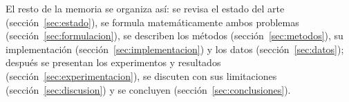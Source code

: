 El resto de la memoria se organiza así: se revisa el estado del arte (sección~\ref{sec:estado}), se formula matemáticamente ambos problemas (sección~\ref{sec:formulacion}), se describen los métodos (sección~\ref{sec:metodos}), su implementación (sección~\ref{sec:implementacion}) y los datos (sección~\ref{sec:datos}); después se presentan los experimentos y resultados (sección~\ref{sec:experimentacion}), se discuten con sus limitaciones (sección~\ref{sec:discusion}) y se concluyen (sección~\ref{sec:conclusiones}).
